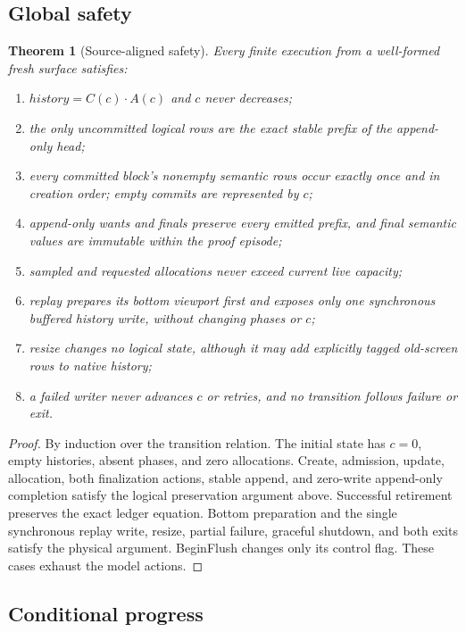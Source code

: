 \documentclass[11pt]{article}
\newtheorem{theorem}{Theorem}[section]
\theoremstyle{definition}
\newcommand{\cat}{\mathbin{\cdot}}
\newcommand{\History}{\mathit{history}}
\begin{document}
\subsection{Global safety}

\begin{theorem}[Source-aligned safety]
\label{thm:safety}
Every finite execution from a well-formed fresh surface satisfies:
\begin{enumerate}
  \item $\History=C(c)\cat A(c)$ and $c$ never decreases;
  \item the only uncommitted logical rows are the exact stable prefix of the
        append-only head;
  \item every committed block's nonempty semantic rows occur exactly once and
        in creation order; empty commits are represented by $c$;
  \item append-only wants and finals preserve every emitted prefix, and final
        semantic values are immutable within the proof episode;
  \item sampled and requested allocations never exceed current live capacity;
  \item replay prepares its bottom viewport first and exposes only one
        synchronous buffered history write, without changing phases or $c$;
  \item resize changes no logical state, although it may add explicitly tagged
        old-screen rows to native history;
  \item a failed writer never advances $c$ or retries, and no transition follows
        failure or exit.
\end{enumerate}
\end{theorem}

\begin{proof}
By induction over the transition relation.  The initial state has $c=0$, empty
histories, absent phases, and zero allocations.  Create, admission, update,
allocation, both finalization actions, stable append, and zero-write append-only
completion satisfy the logical preservation argument above.  Successful
retirement preserves the exact ledger equation.  Bottom preparation and the
single synchronous replay write, resize, partial failure, graceful shutdown,
and both exits satisfy the physical argument.  BeginFlush changes only its control flag.
These cases exhaust the model actions.
\end{proof}

\subsection{Conditional progress}
\end{document}
